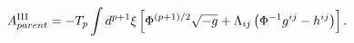 \begin{equation}
A^{{\rm III}}_{parent}=-T_{p}\int d^{p+1}{\xi}\left[{\Phi}^{(p+1)/2}
\sqrt{-g}+{\Lambda}_{ij}\left({\Phi}^{-1}g^{ij}-h^{ij}\right)\right].
\end{equation}

